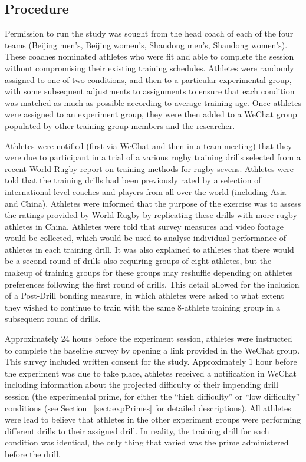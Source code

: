 \subsection{Procedure}
Permission to run the study was sought from the head coach of each of the four teams (Beijing men's, Beijing women's, Shandong men's, Shandong women's).  These coaches nominated athletes who were fit and able to complete the session without compromising their existing training schedules.  Athletes were randomly assigned to one of two conditions, and then to a particular experimental group, with some subsequent adjustments to assignments to ensure that each condition was matched as much as possible according to average training age.  Once athletes were assigned to an experiment group, they were then added to a WeChat group populated by other training group members and the researcher.

Athletes were notified (first via WeChat and then in a team meeting) that they were due to participant in a trial of a various rugby training drills selected from a recent World Rugby report on training methods for rugby sevens.  Athletes were told that the training drills had been previously rated by a selection of international level coaches and players from all over the world (including Asia and China).  Athletes were informed that the purpose of the exercise was to assess the ratings provided by World Rugby by replicating these drills with more rugby athletes in China.  Athletes were told that survey measures and video footage would be collected, which would be used to analyse individual performance of athletes in each training drill.  It was also explained to athletes that there would be a second round of drills also requiring groups of eight athletes, but the makeup of training groups for these groups may reshuffle depending on athletes preferences following the first round of drills.  This detail allowed for the inclusion of a Post-Drill bonding measure, in which athletes were asked to what extent they wished to continue to train with the same 8-athlete training group in a subsequent round of drills.

Approximately 24 hours before the experiment session, athletes were instructed to complete the baseline survey by opening a link provided in the WeChat group.  This survey included written consent for the study. Approximately 1 hour before the experiment was due to take place, athletes received a notification in WeChat including information about the projected difficulty of their impending drill session (the experimental prime, for either the ``high difficulty'' or ``low difficulty'' conditions (see Section ~\ref{sect:expPrimes} for detailed descriptions).   All athletes were lead to believe that athletes in the other experiment groups were performing different drills to their assigned drill.  In reality, the training drill for each condition was identical, the only thing that varied was the prime administered before the drill.

